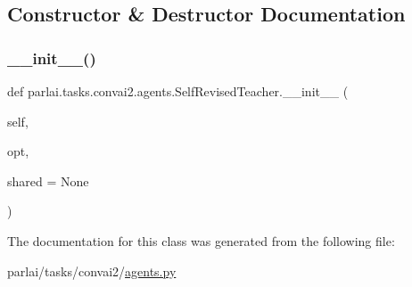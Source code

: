 \subsection{Constructor \& Destructor Documentation}
\mbox{\label{classparlai_1_1tasks_1_1convai2_1_1agents_1_1SelfRevisedTeacher_a7e0e99704aa5772d371e1b03dfe5cf5a}} 
\subsubsection{\texorpdfstring{\+\_\+\+\_\+init\+\_\+\+\_\+()}{\_\_init\_\_()}}
{\footnotesize\ttfamily def parlai.\+tasks.\+convai2.\+agents.\+Self\+Revised\+Teacher.\+\_\+\+\_\+init\+\_\+\+\_\+ (\begin{DoxyParamCaption}\item[{}]{self,  }\item[{}]{opt,  }\item[{}]{shared = {\ttfamily None} }\end{DoxyParamCaption})}



The documentation for this class was generated from the following file\+:\begin{DoxyCompactItemize}
\item 
parlai/tasks/convai2/\hyperlink{parlai_2tasks_2convai2_2agents_8py}{agents.\+py}\end{DoxyCompactItemize}
